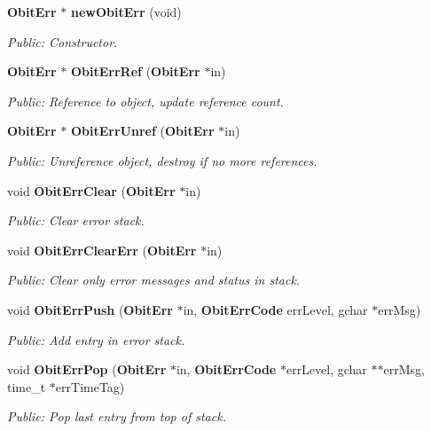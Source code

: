 \begin{CompactItemize}
\item 
{\bf Obit\-Err} $\ast$ {\bf new\-Obit\-Err} (void)
\begin{CompactList}\small\item\em Public: Constructor. \item\end{CompactList}\item 
{\bf Obit\-Err} $\ast$ {\bf Obit\-Err\-Ref} ({\bf Obit\-Err} $\ast$in)
\begin{CompactList}\small\item\em Public: Reference to object, update reference count. \item\end{CompactList}\item 
{\bf Obit\-Err} $\ast$ {\bf Obit\-Err\-Unref} ({\bf Obit\-Err} $\ast$in)
\begin{CompactList}\small\item\em Public: Unreference object, destroy if no more references. \item\end{CompactList}\item 
void {\bf Obit\-Err\-Clear} ({\bf Obit\-Err} $\ast$in)
\begin{CompactList}\small\item\em Public: Clear error stack. \item\end{CompactList}\item 
void {\bf Obit\-Err\-Clear\-Err} ({\bf Obit\-Err} $\ast$in)
\begin{CompactList}\small\item\em Public: Clear only error messages and status in stack. \item\end{CompactList}\item 
void {\bf Obit\-Err\-Push} ({\bf Obit\-Err} $\ast$in, {\bf Obit\-Err\-Code} err\-Level, gchar $\ast$err\-Msg)
\begin{CompactList}\small\item\em Public: Add entry in error stack. \item\end{CompactList}\item 
void {\bf Obit\-Err\-Pop} ({\bf Obit\-Err} $\ast$in, {\bf Obit\-Err\-Code} $\ast$err\-Level, gchar $\ast$$\ast$err\-Msg, time\_\-t $\ast$err\-Time\-Tag)
\begin{CompactList}\small\item\em Public: Pop last entry from top of stack. \item\end{CompactList}\item 
$$
\end{CompactItemize}
